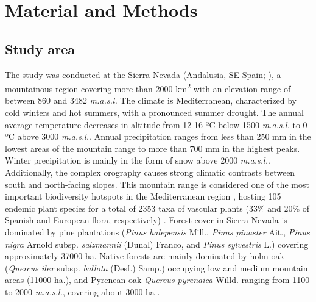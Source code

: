 \section{Material and Methods}\label{sec:multivar:MatMet}
\subsection{Study area}\label{sec:multivar:StudyArea}
The study was conducted at the Sierra Nevada (Andalusia, SE Spain; ), a mountainous region covering more than 2000 km\textsuperscript{2} with an elevation range of between 860 and 3482 \emph{m.a.s.l.} The climate is Mediterranean, characterized by cold winters and hot summers, with a pronounced summer drought. The annual average temperature decreases in altitude from 12-16 ºC below 1500 \emph{m.a.s.l.} to 0 ºC above 3000 \emph{m.a.s.l.}. Annual precipitation ranges from less than 250 mm in the lowest areas of the mountain range to more than 700 mm in the highest peaks. Winter precipitation is mainly in the form of snow above 2000 \emph{m.a.s.l.}. Additionally, the complex orography causes strong climatic contrasts between south and north-facing slopes. This mountain range is considered one of the most important biodiversity hotspots in the Mediterranean region \autocite{Blancaetal1998ThreatenedVascular}, hosting 105 endemic plant species for a total of 2353 taxa of vascular plants (33\% and 20\% of Spanish and European flora, respectively) \autocite{Lorite2016UpdatedChecklist}. Forest cover in Sierra Nevada is dominated by pine plantations (\emph{Pinus halepensis} Mill., \emph{Pinus pinaster} Ait., \emph{Pinus nigra} Arnold subsp. \emph{salzmannii} (Dunal) Franco, and \emph{Pinus sylvestris} L.) covering approximately 37000 ha. Native forests are mainly dominated by holm oak (\emph{Quercus ilex} subsp. \emph{ballota} (Desf.) Samp.) occupying low and medium mountain areas (11000 ha.), and Pyrenean oak \emph{Quercus pyrenaica} Willd. ranging from 1100 to 2000 \emph{m.a.s.l.}, covering about 3000 ha \autocite{PerezLuqueetal2019MapEcosystems}.

